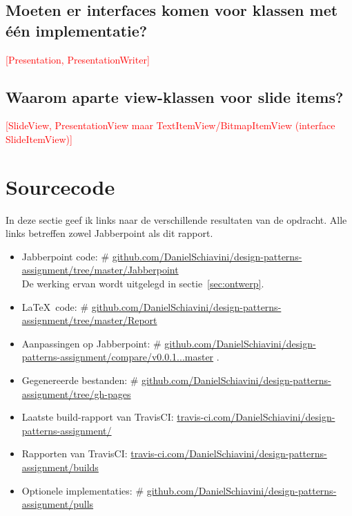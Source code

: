 \documentclass[a4paper]{article}
\makeatletter
\newcommand{\todo}[1]{\textcolor{red}{[#1]}\\}
\newcommand*{\repo}{\begingroup\@makeother\#\@repo}
\newcommand*{\@repo}[2]{%
  \href{https://github.com/DanielSchiavini/design-patterns-assignment/#1}{#2}%
  \endgroup}
\newcommand{\repolink}[1]{\repo{#1}{github.com\-/Daniel\-Schiavini\-/de\-sign-\-pat\-terns-\-as\-sign\-ment\-/#1}}
\newcommand{\cilink}[1]{\href{https://travis-ci.com/DanielSchiavini/design-patterns-assignment/#1}{travis-ci.com/DanielSchiavini/design-patterns-assignment/#1}}
\newcommand{\question}[1]{
  \subsection{#1}
}
\makeatother
\begin{document}
	\question{Moeten er interfaces komen voor klassen met één implementatie?}
		\todo{Presentation, PresentationWriter}

	\question{Waarom aparte view-klassen voor slide items?}
		\todo{SlideView, PresentationView maar TextItemView/BitmapItemView (interface SlideItemView)}

\section{Sourcecode}\label{sec:source}
	In deze sectie geef ik links naar de verschillende resultaten van de opdracht.
	Alle links betreffen zowel Jabberpoint als dit rapport.
	\begin{itemize}
		\item Jabberpoint code:
			\repolink{tree/master/Jabberpoint}\\
			De werking ervan wordt uitgelegd in sectie~\ref{sec:ontwerp}.
		\item \LaTeX ~code:
			\repo{tree/master/Report}{github.com/DanielSchiavini/design-patterns-assignment/tree\-/master\-/Report}
		\item Aanpassingen op Jabberpoint:
			\repolink{compare/v0.0.1...master}.
		\item Gegenereerde bestanden:
			\repolink{tree/gh-pages}
		\item Laatste build-rapport van TravisCI:
			\cilink{}
		\item Rapporten van TravisCI:
			\cilink{builds}
		\item Optionele implementaties:
			\repolink{pulls}
	\end{itemize}
\end{document}
